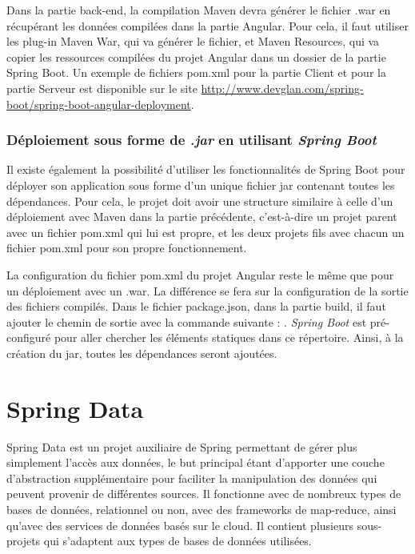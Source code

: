\documentclass{polytech/polytech}
\begin{document}
Dans la partie back-end, la compilation Maven devra générer le fichier .war en récupérant les données compilées dans la partie Angular. Pour cela, il faut utiliser les plug-in Maven War, qui va générer le fichier, et Maven Resources, qui va copier les ressources compilées du projet Angular dans un dossier de la partie Spring Boot. Un exemple de fichiers pom.xml pour la partie Client et pour la partie Serveur est disponible sur le site \url{http://www.devglan.com/spring-boot/spring-boot-angular-deployment}.


\subsection{Déploiement sous forme de \textit{.jar} en utilisant \textit{Spring Boot}}

Il existe également la possibilité d’utiliser les fonctionnalités de Spring Boot pour déployer son application sous forme d’un unique fichier jar contenant toutes les dépendances. Pour cela, le projet doit avoir une structure similaire à celle d’un déploiement avec Maven dans la partie précédente, c’est-à-dire un projet parent avec un fichier pom.xml qui lui est propre, et les deux projets fils avec chacun un fichier pom.xml pour son propre fonctionnement.

La configuration du fichier pom.xml du projet Angular reste le même que pour un déploiement avec un .war. La différence se fera sur la configuration de la sortie des fichiers compilés. Dans le fichier package.json, dans la partie build, il faut ajouter le chemin de sortie avec la commande suivante : . \textit{Spring Boot} est pré-configuré pour aller chercher les éléments statiques dans ce répertoire. Ainsi, à la création du jar, toutes les dépendances seront ajoutées.


\chapter{Spring Data}


Spring Data est un projet auxiliaire de Spring permettant de gérer plus simplement l’accès aux données, le but principal étant d’apporter une couche d’abstraction supplémentaire pour faciliter la manipulation des données qui peuvent provenir de différentes sources. Il fonctionne avec de nombreux types de bases de données, relationnel ou non, avec des frameworks de map-reduce, ainsi qu’avec des services de données basés sur le cloud. Il contient plusieurs sous-projets qui s’adaptent aux types de bases de données utilisées. 
\end{document}
